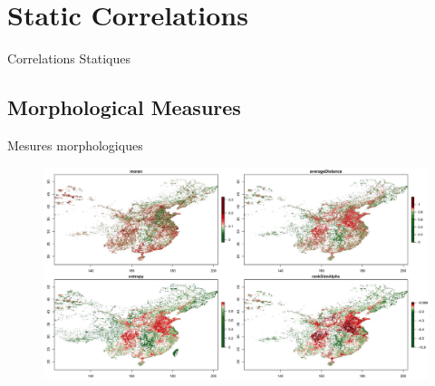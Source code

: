 




\newpage

\section{Static Correlations}{Correlations Statiques}

\label{app:sec:staticcorrelations}



\subsection{Morphological Measures}{Mesures morphologiques}


%




\begin{figure}
\includegraphics[width=\linewidth]{Figures/Final/A-staticcorrelations-morphocn.jpg}
\label{fig:app:staticcorrelations:morphocn}
\end{figure}



